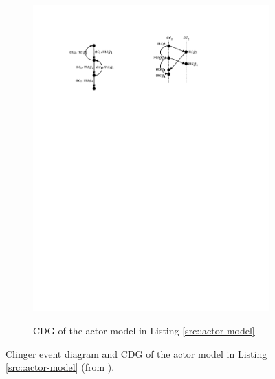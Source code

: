 \begin{figure}
\begin{subfigure}[b]{0.2\textwidth}
  \centering
  \small{
   \includegraphics[width=.8\textwidth]{resources/cdg.pdf}
  }
  \caption{CDG of the actor model in Listing \ref{src::actor-model}}
  \label{fig::cdg}
\end{subfigure}
\caption{Clinger event diagram and CDG of the actor model in Listing \ref{src::actor-model} (from \cite{DBLP:journals/eceasst/KhamespanahSMSR15}).}
\label{fig::clinger-cdg}
\end{figure}

